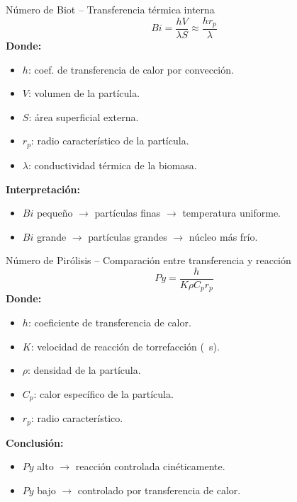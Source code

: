 \documentclass[main.tex]{subfiles}
\begin{document}
\begin{frame}{Número de Biot – Transferencia térmica interna}
\[
Bi = \frac{hV}{\lambda S} \approx \frac{h r_p}{\lambda}
\]
\vspace{0.5em}
\textbf{Donde:}
\begin{itemize}
  \item $h$: coef. de transferencia de calor por convección.
  \item $V$: volumen de la partícula.
  \item $S$: área superficial externa.
  \item $r_p$: radio característico de la partícula.
  \item $\lambda$: conductividad térmica de la biomasa.
\end{itemize}
\vspace{0.5em}
\textbf{Interpretación:}
\begin{itemize}
  \item $Bi$ pequeño $\rightarrow$ partículas finas $\rightarrow$ temperatura uniforme.
  \item $Bi$ grande $\rightarrow$ partículas grandes $\rightarrow$ núcleo más frío.
\end{itemize}
\end{frame}

\begin{frame}{Número de Pirólisis – Comparación entre transferencia y reacción}
\[
Py = \frac{h}{K \rho C_p r_p} 
\]
\vspace{0.5em}
\textbf{Donde:}
\begin{itemize}
  \item $h$: coeficiente de transferencia de calor.
  \item $K$: velocidad de reacción de torrefacción (\si{\per\second}).
  \item $\rho$: densidad de la partícula.
  \item $C_p$: calor específico de la partícula.
  \item $r_p$: radio característico.
\end{itemize}
\vspace{0.5em}
\textbf{Conclusión:}
\begin{itemize}
  \item $Py$ alto $\rightarrow$ reacción controlada cinéticamente.
  \item $Py$ bajo $\rightarrow$ controlado por transferencia de calor.
\end{itemize}
\end{frame}
\end{document}
